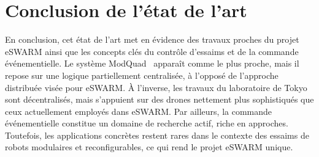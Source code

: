 \section{Conclusion de l'état de l'art}

En conclusion, cet état de l’art met en évidence des travaux proches du projet eSWARM ainsi que les concepts clés du contrôle d’essaims et de la commande événementielle. Le système ModQuad~\cite{gabrich_modquad-dof_2020} apparaît comme le plus proche, mais il repose sur une logique partiellement centralisée, à l’opposé de l’approche distribuée visée pour eSWARM. À l’inverse, les travaux du laboratoire de Tokyo~\cite{sugihara_beatle_2024,sugihara_design_2023} sont décentralisés, mais s’appuient sur des drones nettement plus sophistiqués que ceux actuellement employés dans eSWARM.
Par ailleurs, la commande événementielle constitue un domaine de recherche actif, riche en approches. Toutefois, les applications concrètes restent rares dans le contexte des essaims de robots modulaires et reconfigurables, ce qui rend le projet eSWARM unique.